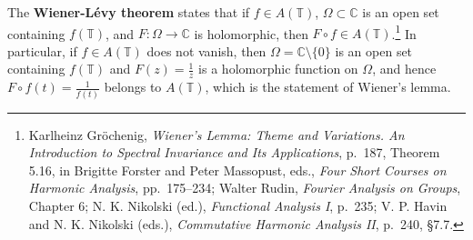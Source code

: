 \documentclass{article}
\theoremstyle{definition}
\theoremstyle{definition}
\begin{document}
The \textbf{Wiener-L\'evy theorem} states that if $f \in A(\mathbb{T})$,
$\Omega \subset \mathbb{C}$ is an open set containing $f(\mathbb{T})$, and $F:\Omega \to \mathbb{C}$
is holomorphic, then $F \circ f \in A(\mathbb{T})$.\footnote{Karlheinz Gr\"ochenig,
{\em Wiener's Lemma: Theme and Variations. An Introduction to
Spectral Invariance and Its Applications}, p.~187, Theorem 5.16, in Brigitte Forster and Peter Massopust, eds., {\em Four Short Courses on Harmonic Analysis}, pp.~175--234;
Walter Rudin, {\em Fourier Analysis on Groups}, Chapter 6; N. K. Nikolski (ed.), {\em Functional Analysis I}, p.~235;
V. P. Havin and N. K. Nikolski (eds.), {\em Commutative Harmonic Analysis II}, p.~240, \S 7.7.}
In particular, if $f \in A(\mathbb{T})$ does not vanish, then $\Omega=\mathbb{C} \setminus \{0\}$ is an open set
containing $f(\mathbb{T})$ and $F(z)=\frac{1}{z}$ is a holomorphic function on $\Omega$, and hence
$F \circ f(t)=\frac{1}{f(t)}$ belongs to $A(\mathbb{T})$, which is the statement of Wiener's lemma.
\end{document}
